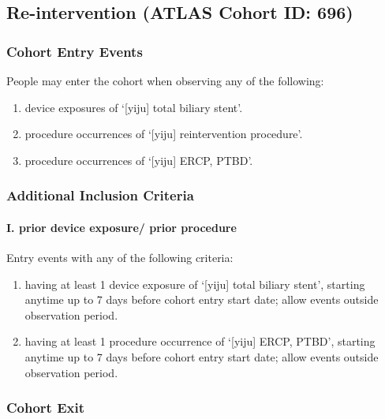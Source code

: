\documentclass[
  12pt,
]{article}
\providecommand{\tightlist}{%
  \setlength{\itemsep}{0pt}\setlength{\parskip}{0pt}}
\begin{document}
\subsection{Re-intervention (ATLAS Cohort ID: 696)}\label{re-intervention-atlas-cohort-id-696}

\subsubsection{Cohort Entry Events}\label{cohort-entry-events-6}

People may enter the cohort when observing any of the following:

\begin{enumerate}
\def\labelenumi{\arabic{enumi}.}
\item
  device exposures of `{[}yiju{]} total biliary stent'.
\item
  procedure occurrences of `{[}yiju{]} reintervention procedure'.
\item
  procedure occurrences of `{[}yiju{]} ERCP, PTBD'.
\end{enumerate}

\subsubsection{Additional Inclusion Criteria}\label{additional-inclusion-criteria-3}

\paragraph*{I. prior device exposure/ prior procedure}\label{i.-prior-device-exposure-prior-procedure}

Entry events with any of the following criteria:

\begin{enumerate}
\def\labelenumi{\arabic{enumi}.}
\tightlist
\item
  having at least 1 device exposure of `{[}yiju{]} total biliary stent', starting anytime up to 7 days before cohort entry start date; allow events outside observation period.
\item
  having at least 1 procedure occurrence of `{[}yiju{]} ERCP, PTBD', starting anytime up to 7 days before cohort entry start date; allow events outside observation period.
\end{enumerate}

\subsubsection{Cohort Exit}\label{cohort-exit-6}
\end{document}
